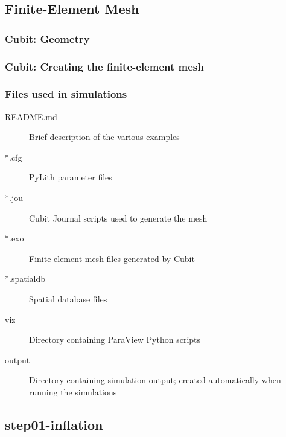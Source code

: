 \documentclass[aspectratio=169]{beamer}
\begin{document}
\subsection{Finite-Element Mesh}

\begin{frame}
  \frametitle{Cubit: Geometry}
  \summary{}

  
\end{frame}


\begin{frame}
  \frametitle{Cubit: Creating the finite-element mesh}

  
\end{frame}


\begin{frame}
  \frametitle{Files used in simulations}

  \begin{description}
  \item[README.md] Brief description of the various examples
  \item[*.cfg] PyLith parameter files
  \item[*.jou] Cubit Journal scripts used to generate the mesh
  \item[*.exo] Finite-element mesh files generated by Cubit
  \item[*.spatialdb] Spatial database files
  \item[viz] Directory containing ParaView Python scripts
  \item[output] Directory containing simulation output; created automatically when running the simulations
  \end{description}

\end{frame}
  

\subsection{step01-inflation}
\end{document}
